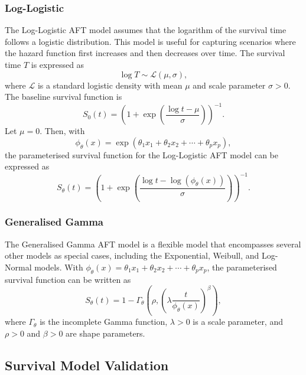 
\subsubsection{Log-Logistic}
The Log-Logistic AFT model assumes that the logarithm of the survival time follows a logistic distribution. This model is useful for capturing scenarios where the hazard function first increases and then decreases over time. The survival time $T$ is expressed as
\[ %
    \log T \sim \mathcal{L}(\mu, \sigma),
\]
where $\mathcal{L}$ is a standard logistic density with mean $\mu$
and scale parameter $\sigma > 0$.  The baseline survival function is
\[ %
    S_0(t) = {\left(1 + \exp\left( \frac{\log t - \mu}{\sigma} \right)\right)} ^{-1}.
\]
Let $\mu=0$. Then, with
\[
    \phi_\theta(x) = \exp(\theta_1 x_1 + \theta_2 x_2 + \cdots + \theta_p x_p),
\]
the parameterised survival function for the Log-Logistic AFT model can be expressed as
\[ %
    S_{\theta}(t) = {\left( 1 + \exp \left( \frac{\log t - \log(\phi_\theta(x))}{\sigma}\right) \right)}^{-1}.
\]


\subsubsection{Generalised Gamma}
The Generalised Gamma AFT model is a flexible model that encompasses several other models as special cases, including the Exponential, Weibull, and Log-Normal models.
With $\phi_{\theta}(x) = \theta_1 x_1 + \theta_2 x_2 + \cdots + \theta_p x_p$, the parameterised survival function can be written as
\[
    S_{\theta}(t) = 1 - \Gamma_{\theta}\left(\rho, {\left(\lambda \frac{t}{\phi_\theta(x)}\right)}^\beta\right),
\]
where $\Gamma_{\theta}$ is the incomplete Gamma function, $\lambda > 0$ is a scale parameter, and $\rho>0$ and $\beta > 0$ are shape parameters.



\subsection{Survival Model Validation}
\label{metrics}

